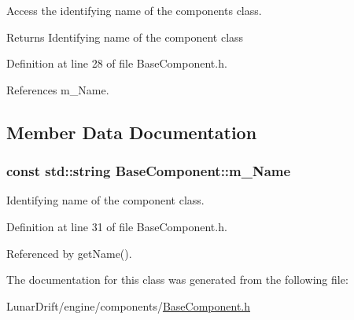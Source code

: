Access the identifying name of the component\textquotesingle{}s class. 

\begin{DoxyReturn}{Returns}
Identifying name of the component class 
\end{DoxyReturn}


Definition at line 28 of file Base\+Component.\+h.



References m\+\_\+\+Name.



\subsection{Member Data Documentation}
\subsubsection[{\texorpdfstring{m\+\_\+\+Name}{m_Name}}]{\setlength{\rightskip}{0pt plus 5cm}const std\+::string Base\+Component\+::m\+\_\+\+Name\hspace{0.3cm}{\ttfamily [private]}}\hypertarget{class_base_component_a45ae101f5812bec0b034a22283e91109}{}\label{class_base_component_a45ae101f5812bec0b034a22283e91109}


Identifying name of the component class. 



Definition at line 31 of file Base\+Component.\+h.



Referenced by get\+Name().



The documentation for this class was generated from the following file\+:\begin{DoxyCompactItemize}
\item 
Lunar\+Drift/engine/components/\hyperlink{_base_component_8h}{Base\+Component.\+h}\end{DoxyCompactItemize}
